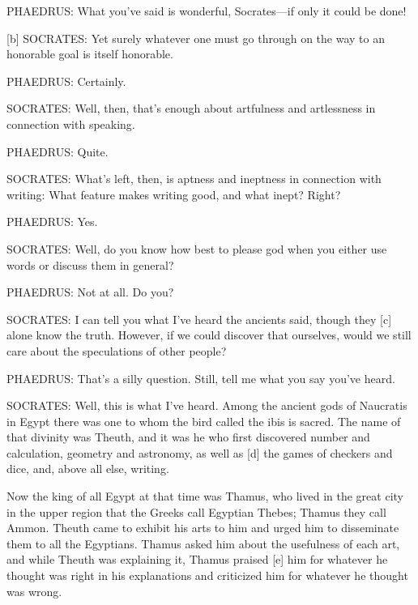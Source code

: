 PHAEDRUS: What you've said is wonderful, Socrates---if only it could be
done!

{[}b{]} SOCRATES: Yet surely whatever one must go through on the way to
an honorable goal is itself honorable.

PHAEDRUS: Certainly.

SOCRATES: Well, then, that's enough about artfulness and artlessness in
connection with speaking.

PHAEDRUS: Quite.

SOCRATES: What's left, then, is aptness and ineptness in connection with
writing: What feature makes writing good, and what inept? Right?

PHAEDRUS: Yes.

SOCRATES: Well, do you know how best to please god when you either use
words or discuss them in general?

PHAEDRUS: Not at all. Do you?

SOCRATES: I can tell you what I've heard the ancients said, though they
{[}c{]} alone know the truth. However, if we could discover that
ourselves, would we still care about the speculations of other people?

PHAEDRUS: That's a silly question. Still, tell me what you say you've
heard.

SOCRATES: Well, this is what I've heard. Among the ancient gods of
Naucratis in Egypt
there was one to whom the bird called the ibis is sacred. The name of
that divinity was
Theuth, and it was he
who first discovered number and calculation, geometry and astronomy, as
well as {[}d{]} the games of checkers and dice, and, above all else,
writing.

Now the king of all Egypt at that time was
Thamus, who lived in
the great city in the upper region that the Greeks call Egyptian Thebes;
Thamus they call
Ammon. Theuth came to
exhibit his arts to him and urged him to disseminate them to all the
Egyptians. Thamus asked him about the usefulness of each art, and while
Theuth was explaining it, Thamus praised {[}e{]} him for whatever he
thought was right in his explanations and criticized him for whatever he
thought was wrong.

